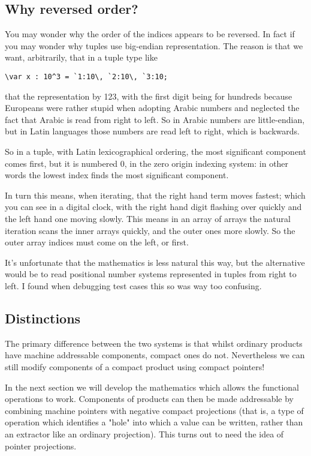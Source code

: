 \documentclass{article}
\begin{document}
\subsection{Why reversed order?}
You may wonder why the order of the indices appears to be reversed.
In fact if you may wonder why tuples use big-endian representation.
The reason is that we want, arbitrarily, that in a tuple type like
\begin{verbatim}
\var x : 10^3 = `1:10\, `2:10\, `3:10;
\end{verbatim}
that the representation by 123, with the first digit being for hundreds
because Europeans were rather stupid when adopting Arabic numbers and
neglected the fact that Arabic is read from right to left. So in Arabic
numbers are little-endian, but in Latin languages those numbers are
read left to right, which is backwards.

So in a tuple, with Latin lexicographical ordering, the most significant
component comes first, but it is numbered 0, in the zero origin indexing
system: in other words the lowest index finds the most significant component.

In turn this means, when iterating, that the right hand term moves fastest;
which you can see in a digital clock, with the right hand digit flashing over
quickly and the left hand one moving slowly. This means in an array of arrays
the natural iteration scans the inner arrays quickly, and the outer ones more
slowly. So the outer array indices must come on the left, or first.

It's unfortunate that the mathematics is less natural this way, but the alternative
would be to read positional number systems represented in tuples from right to left.
I found when debugging test cases this so was way too confusing.

\subsection{Distinctions}
The primary difference between the two systems is that whilst ordinary products
have machine addressable components, compact ones do not. Nevertheless we can
still modify components of a compact product using compact pointers!

In the next section we will develop the mathematics which allows the functional
operations to work. Components of products can then be made addressable
by combining machine pointers with negative compact projections (that is,
a type of operation which identifies a "hole" into which a value can be written,
rather than an extractor like an ordinary projection). This turns out
to need the idea of pointer projections.
\end{document}
